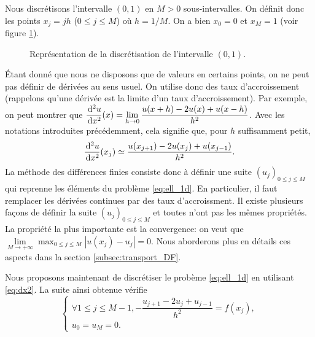 \documentclass[12pt,a4paper,twoside]{article}
\begin{document}
Nous discr\'etisons l'intervalle $(0,1)$ en $M>0$ sous-intervalles.
On d\'efinit donc les points $x_j = j h$ ($0 \leq j \leq M$) o\`u $h = 1/M$.
On a bien $x_0 = 0$ et $x_M = 1$ (voir figure \ref{fig:disc_x}).

\begin{figure}
\centering
{} 
\caption{Repr\'esentation de la discr\'etisation de l'intervalle $(0,1)$.}
\label{fig:disc_x}
\end{figure}


\'Etant donn\'e que nous ne disposons que de valeurs en certains points, on ne peut
pas d\'efinir de d\'eriv\'ees au sens usuel. On utilise donc des taux d'accroissement
(rappelons qu'une d\'eriv\'ee est la limite d'un taux d'accroissement).
Par exemple, on peut montrer que 
$\dfrac{\!\;\mathrm{d}^2 u}{\!\;\mathrm{d} x^2}(x) 
= \lim\limits_{h \to 0} \dfrac{u(x+h) - 2 u(x) + u(x-h)}{h^2}$.
Avec les notations introduites pr\'ec\'edemment, cela signifie que,
pour $h$ suffisamment petit, 
\begin{align}
  \label{eq:dx2}
  \dfrac{\!\;\mathrm{d}^2 u}{\!\;\mathrm{d} x^2}(x_j) \simeq \dfrac{u(x_{j+1}) - 2 u(x_j) + u(x_{j-1})}{h^2} .
\end{align}
La m\'ethode des diff\'erences finies consiste donc \`a d\'efinir une suite $(u_j)_{0\leq j \leq M}$
qui reprenne les \'el\'ements du probl\`eme \eqref{eq:ell_1d}. En particulier, il faut remplacer
les d\'eriv\'ees continues par des taux d'accroissment.
Il existe plusieurs fa\c{c}ons de d\'efinir la suite $(u_j)_{0\leq j \leq M}$ et toutes
n'ont pas les m\^emes propri\'et\'es. La propri\'et\'e la plus importante est la convergence:
on veut que $\lim\limits_{M \to +\infty} \max_{0 \leq j \leq M} | u(x_j) - u_j | = 0$.
Nous aborderons plus en d\'etails ces aspects dans la section \ref{subsec:transport_DF}.


Nous proposons maintenant de discr\'etiser le prob\`eme \eqref{eq:ell_1d}
en utilisant \eqref{eq:dx2}.
La suite ainsi obtenue v\'erifie
\begin{equation}
  \label{eq:ell_DF}
  \left\{
    \begin{array}{l}
      \forall 1 \leq j \leq M-1 , - \dfrac{u_{j+1} - 2 u_j + u_{j-1}}{h^2} = f(x_j) ,
      \\
      u_0 = u_M = 0 .
    \end{array}
  \right.
\end{equation}
\end{document}
